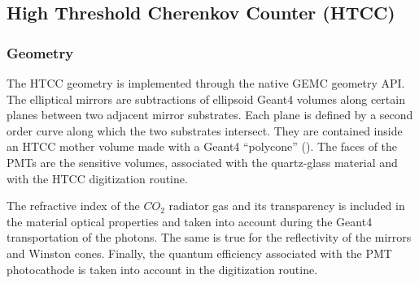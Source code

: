 \subsection{High Threshold Cherenkov Counter (HTCC)}

\subsubsection{Geometry}

The HTCC geometry is implemented through the native GEMC geometry API. The elliptical mirrors are subtractions of
ellipsoid Geant4 volumes along certain planes between two adjacent mirror substrates. Each plane is defined by a second order
curve along which the two substrates intersect.
They are contained inside an HTCC mother volume made with a Geant4 ``polycone'' ().
The faces of the PMTs are the sensitive volumes, associated with the quartz-glass material and with the HTCC digitization routine.

The refractive index of the $CO_2$ radiator gas and its transparency is included in the material optical properties and taken
into account during the Geant4 transportation of the photons. The same is true for the reflectivity of the mirrors and Winston cones.
Finally, the quantum efficiency associated with the PMT photocathode is taken into account in
the digitization routine.


